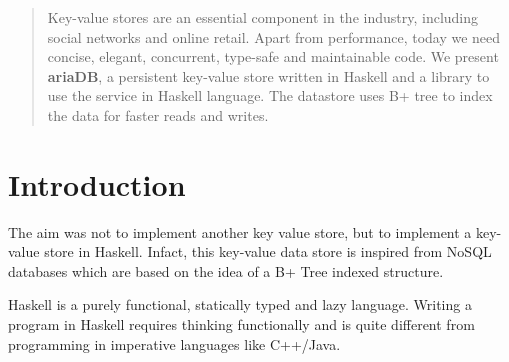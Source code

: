 \documentclass[a0,portrait]{a0poster}
\begin{document}
\begin{multicols}{2} %


\color{Navy}

\begin{abstract}
Key-value stores are an essential component in the industry, including social networks and online retail. Apart from performance, today we need concise, elegant, concurrent, type-safe and maintainable code. We present \textbf{ariaDB}, a persistent key-value store written in Haskell and a library to use the service in Haskell language. The datastore uses B+ tree to index the data for faster reads and writes. 
\end{abstract}

\color{Black}
\section*{Introduction}
The aim was not to implement another key value store, but to implement a key-value store in Haskell. Infact, this key-value data store is inspired from NoSQL databases which are based on the idea of a B+ Tree indexed structure.

Haskell is a purely functional, statically typed and lazy language. Writing a program in Haskell requires thinking functionally and is quite different from programming in imperative languages like C++/Java.

\color{Black}


\end{multicols}
\end{document}
